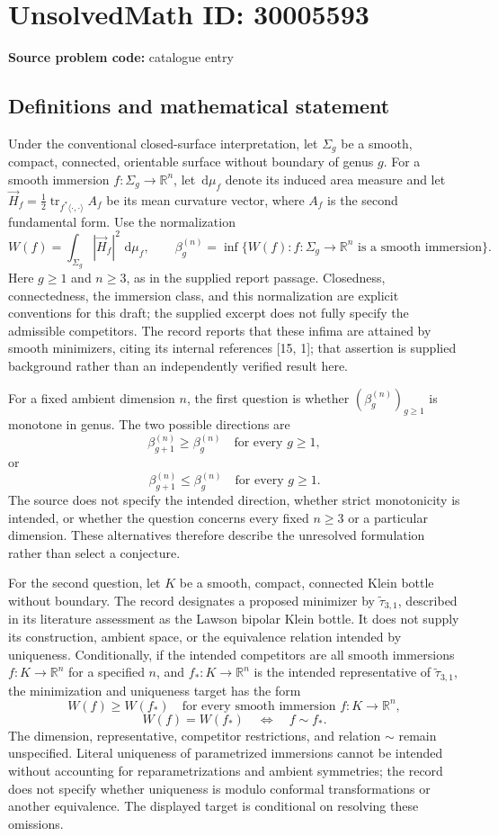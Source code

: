 \documentclass[11pt]{article}
\newcommand{\R}{\mathbb{R}}
\newcommand{\dd}{\,\mathrm{d}}
\begin{document}
\section*{UnsolvedMath ID: 30005593}
\textbf{Source problem code:} catalogue entry
\subsection{Definitions and mathematical statement}
Under the conventional closed-surface interpretation, let \(\Sigma_g\) be a smooth, compact, connected, orientable surface without boundary of genus \(g\). For a smooth immersion \(f\colon\Sigma_g\to\R^n\), let \(\dd\mu_f\) denote its induced area measure and let \(\vec H_f=\tfrac12\operatorname{tr}_{f^*\langle\cdot,\cdot\rangle}A_f\) be its mean curvature vector, where \(A_f\) is the second fundamental form. Use the normalization
\[
W(f)=\int_{\Sigma_g}|\vec H_f|^2\,\dd\mu_f,
\qquad
\beta_g^{(n)}=\inf\bigl\{W(f):f\colon\Sigma_g\to\R^n\text{ is a smooth immersion}\bigr\}.
\]
Here \(g\geq1\) and \(n\geq3\), as in the supplied report passage. Closedness, connectedness, the immersion class, and this normalization are explicit conventions for this draft; the supplied excerpt does not fully specify the admissible competitors. The record reports that these infima are attained by smooth minimizers, citing its internal references [15, 1]; that assertion is supplied background rather than an independently verified result here.

For a fixed ambient dimension \(n\), the first question is whether \((\beta_g^{(n)})_{g\geq1}\) is monotone in genus. The two possible directions are
\[
\beta_{g+1}^{(n)}\geq\beta_g^{(n)}\quad\text{for every }g\geq1,
\]
or
\[
\beta_{g+1}^{(n)}\leq\beta_g^{(n)}\quad\text{for every }g\geq1.
\]
The source does not specify the intended direction, whether strict monotonicity is intended, or whether the question concerns every fixed \(n\geq3\) or a particular dimension. These alternatives therefore describe the unresolved formulation rather than select a conjecture.

For the second question, let \(K\) be a smooth, compact, connected Klein bottle without boundary. The record designates a proposed minimizer by \(\widetilde\tau_{3,1}\), described in its literature assessment as the Lawson bipolar Klein bottle. It does not supply its construction, ambient space, or the equivalence relation intended by uniqueness. Conditionally, if the intended competitors are all smooth immersions \(f\colon K\to\R^n\) for a specified \(n\), and \(f_*\colon K\to\R^n\) is the intended representative of \(\widetilde\tau_{3,1}\), the minimization and uniqueness target has the form
\[
W(f)\geq W(f_*)\quad\text{for every smooth immersion }f\colon K\to\R^n,
\]
\[
W(f)=W(f_*)\quad\Longleftrightarrow\quad f\sim f_*.
\]
The dimension, representative, competitor restrictions, and relation \(\sim\) remain unspecified. Literal uniqueness of parametrized immersions cannot be intended without accounting for reparametrizations and ambient symmetries; the record does not specify whether uniqueness is modulo conformal transformations or another equivalence. The displayed target is conditional on resolving these omissions.
\end{document}
